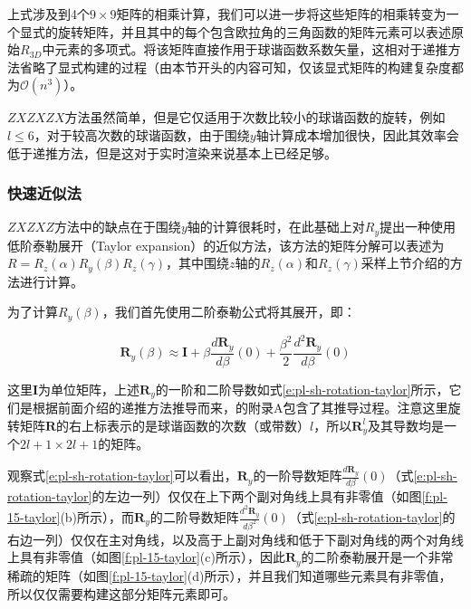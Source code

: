 上式涉及到4个$9\times 9$矩阵的相乘计算，我们可以进一步将这些矩阵的相乘转变为一个显式的旋转矩阵，并且其中的每个包含欧拉角的三角函数的矩阵元素可以表述原始$R_{3D}$中元素的多项式。将该矩阵直接作用于球谐函数系数矢量，这相对于递推方法省略了显式构建的过程（由本节开头的内容可知，仅该显式矩阵的构建复杂度都为$\mathcal{O}(n^{3})$）。

$ZXZXZX$方法虽然简单，但是它仅适用于次数比较小的球谐函数的旋转，例如$l\leq 6$，对于较高次数的球谐函数，由于围绕$y$轴计算成本增加很快，因此其效率会低于递推方法，但是这对于实时渲染来说基本上已经足够。



\subsubsection{快速近似法}
$ZXZXZ$方法中的缺点在于围绕$y$轴的计算很耗时，\cite{a:FastApproximationtoSphericalHarmonicRotation}在此基础上对$R_y$提出一种使用低阶泰勒展开（Taylor expansion）的近似方法，该方法的矩阵分解可以表述为
	$R=R_z(\alpha)R_y(\beta)R_z(\gamma)$，其中围绕$z$轴的$R_z(\alpha)$和$R_z(\gamma)$采样上节介绍的方法进行计算。

为了计算$R_y(\beta)$，我们首先使用二阶泰勒公式将其展开，即：

\begin{equation}\label{e:pl-sh-rotation-2-taylor}
	\mathbf{R}_y(\beta)\approx\mathbf{I}+\beta\frac{d\mathbf{R}_y}{d\beta}(0)+\frac{\beta^{2}}{2}\frac{d^{2}\mathbf{R}_y}{d\beta}(0)
\end{equation}

这里$\mathbf{I}$为单位矩阵，上述$\mathbf{R}_y$的一阶和二阶导数如式\ref{e:pl-sh-rotation-taylor}所示，它们是根据前面介绍的递推方法推导而来，\cite{a:FastApproximationtoSphericalHarmonicRotation}的附录A包含了其推导过程。注意这里旋转矩阵$\mathbf{R}$的右上标表示的是球谐函数的次数（或带数）$l$，所以$\mathbf{R}^{l}_y$及其导数均是一个$2l+1\times 2l+1$的矩阵。

观察式\ref{e:pl-sh-rotation-taylor}可以看出，$\mathbf{R}_y$的一阶导数矩阵$\frac{d\mathbf{R}_y}{d\beta}(0)$（式\ref{e:pl-sh-rotation-taylor}的左边一列）仅仅在上下两个副对角线上具有非零值（如图\ref{f:pl-15-taylor}(b)所示），而$\mathbf{R}_y$的二阶导数矩阵$\frac{d^{2}\mathbf{R}_y}{d\beta^{2}}(0)$（式\ref{e:pl-sh-rotation-taylor}的右边一列）仅仅在主对角线，以及高于上副对角线和低于下副对角线的两个对角线上具有非零值（如图\ref{f:pl-15-taylor}(c)所示），因此$\mathbf{R}_y$的二阶泰勒展开是一个非常稀疏的矩阵（如图\ref{f:pl-15-taylor}(d)所示），并且我们知道哪些元素具有非零值，所以仅仅需要构建这部分矩阵元素即可。

